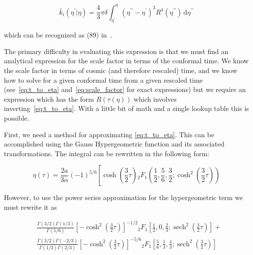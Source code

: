 \documentclass[preprint,notitlepage,amsmath,amssymb,floatfix]{revtex4-1}
\DeclareMathOperator{\sech}{sech}
\begin{document}
\begin{equation}
\label{eq:avg_degree_uni}
\bar{k}_i\left(\eta^\prime|\eta\right) = \frac{4}{3}\pi\delta\int_{\eta^\prime}^\eta\!\left(\eta^{\prime\prime} - \eta^\prime\right)^3 R^4\left(\eta^{\prime\prime}\right)\,\mathrm d\eta^{\prime\prime}
\end{equation}

\noindent which can be recognized as (89) in~\cite{ref:snc2012}.

The primary difficulty in evaluating this expression is that we must find an analytical expression for the scale factor in terms of the conformal time.
We know the scale factor in terms of cosmic (and therefore rescaled) time, and we know how to solve for a given conformal time from a given rescaled time (see~\eqref{eq:t_to_eta} and~\eqref{eq:scale_factor} for exact expressions) but we require an expression which has the form $R\left(\tau\left(\eta\right)\right)$ which involves inverting~\eqref{eq:t_to_eta}.
With a little bit of math and a single lookup table this is possible. \par
First, we need a method for approximating \eqref{eq:t_to_eta}.
This can be accomplished using the Gauss Hypergeometric function and its associated transformations.
The integral can be rewritten in the following form:

\begin{equation}
\eta\left(\tau\right) = \frac{2a}{3\alpha}\left(-1\right)^{5/6}\left[\cosh\left(\frac{3}{2}\tau\right){}_2F_1\left(\frac{1}{2},\frac{5}{6},\frac{3}{2};\cosh^2\left(\frac{3}{2}\tau\right)\right)
\end{equation}

\noindent However, to use the power series approximation for the hypergeometric term we must rewrite it as

\begin{equation}
\begin{split}
& \frac{\Gamma\left(3/2\right)\Gamma\left(1/3\right)}{\Gamma\left(5/6\right)}\left[-\cosh^2\left(\frac{3}{2}\tau\right)\right]^{-1/2}{}_2F_1\left[\frac{1}{2},0,\frac{2}{3};\sech^2\left(\frac{3}{2}\tau\right)\right] + \\
& \frac{\Gamma\left(3/2\right)\Gamma\left(-2/3\right)}{\Gamma\left(1/2\right)\Gamma\left(2/3\right)}\left[-\cosh^2\left(\frac{3}{2}\tau\right)\right]^{-5/6}{}_2F_1\left[\frac{5}{6},\frac{1}{3},\frac{4}{3};\sech^2\left(\frac{3}{2}\tau\right)\right]
\end{split}
\end{equation}
\end{document}

